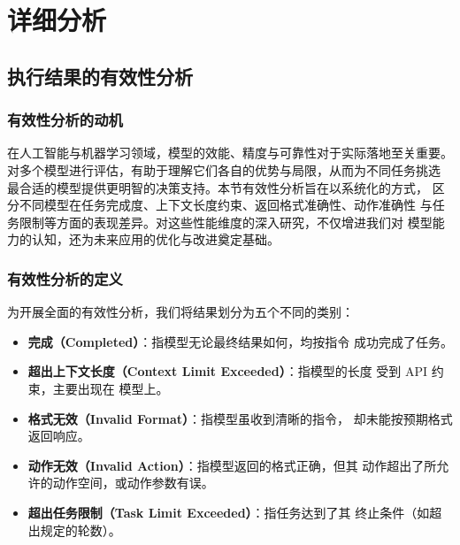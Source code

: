 
\section{详细分析}\label{app:detailed}

\subsection{执行结果的有效性分析}

\subsubsection{有效性分析的动机}

在人工智能与机器学习领域，模型的效能、精度与可靠性对于实际落地至关重要。
对多个模型进行评估，有助于理解它们各自的优势与局限，从而为不同任务挑选
最合适的模型提供更明智的决策支持。本节有效性分析旨在以系统化的方式，
区分不同模型在任务完成度、上下文长度约束、返回格式准确性、动作准确性
与任务限制等方面的表现差异。对这些性能维度的深入研究，不仅增进我们对
模型能力的认知，还为未来应用的优化与改进奠定基础。

\subsubsection{有效性分析的定义}

为开展全面的有效性分析，我们将结果划分为五个不同的类别：

\begin{itemize}
    \item \textbf{完成（Completed）}：指模型无论最终结果如何，均按指令
          成功完成了任务。
    \item \textbf{超出上下文长度（Context Limit Exceeded）}：指模型的长度
          受到 API 约束，主要出现在  模型上。
    \item \textbf{格式无效（Invalid Format）}：指模型虽收到清晰的指令，
          却未能按预期格式返回响应。
    \item \textbf{动作无效（Invalid Action）}：指模型返回的格式正确，但其
          动作超出了所允许的动作空间，或动作参数有误。
    \item \textbf{超出任务限制（Task Limit Exceeded）}：指任务达到了其
          终止条件（如超出规定的轮数）。
\end{itemize}

